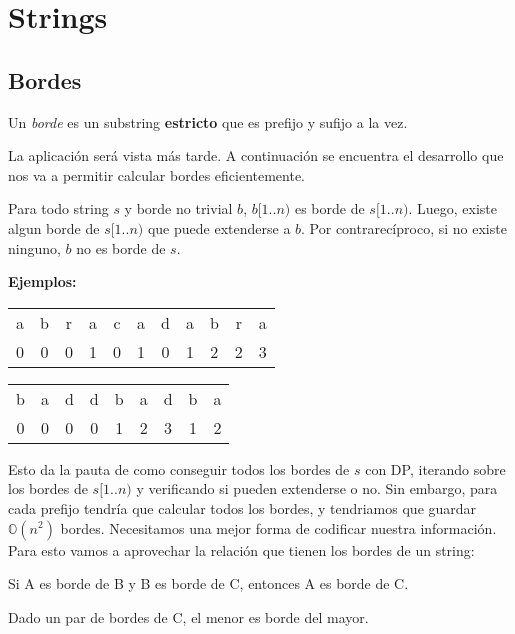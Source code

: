 \section{Strings}

\subsection*{Bordes}

Un \textit{borde} es un substring \textbf{estricto} que es prefijo y sufijo a la vez.

La aplicación será vista más tarde. A continuación se encuentra el desarrollo que nos va a permitir calcular bordes eficientemente.

Para todo string $s$ y borde no trivial $b$, $b[1..n)$ es borde de $s[1..n)$. Luego, existe algun borde de $s[1..n)$ que puede extenderse a $b$. Por contrarecíproco, si no existe ninguno, $b$ no es borde de $s$.


\textbf{Ejemplos:}

\begin{tabular}{ccccccccccc}
    a & b & r & a & c & a & d & a & b & r & a \\
    0 & 0 & 0 & 1 & 0 & 1 & 0 & 1 & 2 & 2 & 3
\end{tabular}

\begin{tabular}{ccccccccc}
    b & a & d & d & b & a & d & b & a \\
    0 & 0 & 0 & 0 & 1 & 2 & 3 & 1 & 2
\end{tabular}
 
Esto da la pauta de como conseguir todos los bordes de $s$ con DP, iterando sobre los bordes de $s[1..n)$ y verificando si pueden extenderse o no. Sin embargo, para cada prefijo tendría que calcular todos los bordes, y tendriamos que guardar $\mathds{O}(n^2)$ bordes. Necesitamos una mejor forma de codificar nuestra información. Para esto vamos a aprovechar la relación que tienen los bordes de un string:

\begin{lema}
    Si A es borde de B y B es borde de C, entonces A es borde de C.
\end{lema}

\begin{lema}
    Dado un par de bordes de C, el menor es borde del mayor.
\end{lema}

